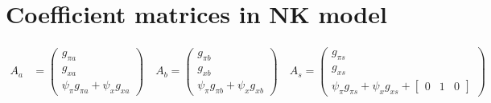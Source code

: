 \documentclass[11pt]{article}
\renewcommand{\[}{\begin{equation}}
\renewcommand{\]}{\end{equation}}
\begin{document}

\clearpage
\newpage



\newpage
\appendix
\section{Coefficient matrices in NK model}\label{app_A_matrices}
\begin{align}
A_a & = \begin{pmatrix} g_{\pi a} \\ g_{x a} \\ \psi_{\pi}g_{\pi a} + \psi_xg_{x a}
\end{pmatrix}
\quad A_b = \begin{pmatrix} g_{\pi b} \\ g_{x b} \\ \psi_{\pi}g_{\pi b} + \psi_xg_{x b}
\end{pmatrix}
 \quad A_s = \begin{pmatrix} g_{\pi s} \\ g_{x s} \\ \psi_{\pi}g_{\pi s} + \psi_xg_{x s} + \begin{bmatrix} 0 & 1& 0\end{bmatrix}

\end{pmatrix}
\end{align}
\end{document}
